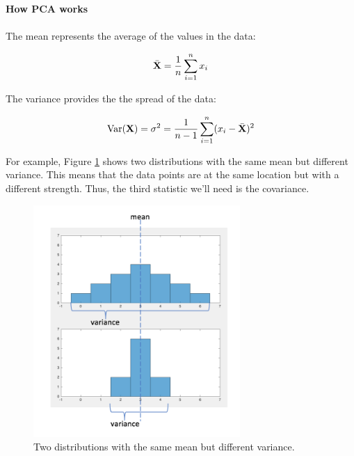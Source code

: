 \documentclass[11pt, oneside]{article}   	%
\begin{document}
\paragraph{How PCA works}
\paragraph{}

The mean represents the average of the values in the data:

\begin{equation}
   \bar{{\bf X}} = \frac{1}{n} \sum_{i=1}^{n} x_i 
\end{equation}

The variance provides the the spread of the data:

\begin{equation}
   \text{Var} ({\bf X}) = \sigma^2  = \frac{1}{n-1} \sum_{i=1}^{n} ( x_i -  \bar{{\bf X}})^2
\end{equation}


For example, Figure \ref{fig:MeanVariance} shows two distributions with the same mean but different variance. This means that the data points are at the same location but with a different strength. Thus, the third statistic we'll need is the covariance.

\begin{figure}[!h]
	\centering
	\includegraphics[width=0.7\textwidth]{same-mean_different-variance}
	\caption{Two distributions with the same mean but different variance.}
	\label{fig:MeanVariance}
\end{figure}
\end{document}
